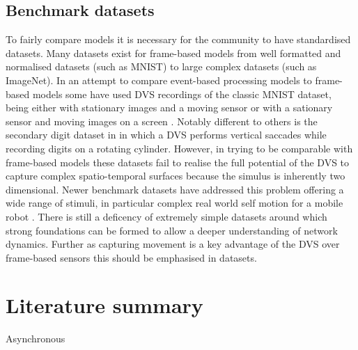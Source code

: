 \subsection{Benchmark datasets}
To fairly compare models it is necessary for the community to have standardised datasets\cite{barranco2016dataset, Gibson2014, tan2015benchmarking}.
Many datasets exist for frame-based models from well formatted and normalised datasets (such as MNIST\cite{lecun1998gradient}) to large complex datasets (such as ImageNet\cite{deng2009imagenet}).
In an attempt to compare event-based processing models to frame-based models some have used DVS recordings of the classic MNIST dataset, being either with stationary images and a moving sensor \cite{OConnor2013, orchard2015converting} or with a sationary sensor and moving images on a screen \cite{serrano2015poker, akolkar2015can}.
Notably different to others is the secondary digit dataset in \cite{akolkar2015can} in which a DVS performs vertical saccades while recording digits on a rotating cylinder.
However, in trying to be comparable with frame-based models these datasets fail to realise the full potential of the DVS to capture complex spatio-temporal surfaces because the simulus is inherently two dimensional.
Newer benchmark datasets have addressed this problem offering a wide range of stimuli, in particular complex real world self motion for a mobile robot \cite{Gibson2014, barranco2016dataset}.
There is still a deficency of extremely simple datasets around which strong foundations can be formed to allow a deeper understanding of network dynamics.
Further as capturing movement is a key advantage of the DVS over frame-based sensors this should be emphasised in datasets.




\section{Literature summary}      %
Asynchronous








